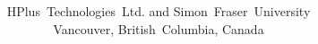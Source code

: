 \documentclass[letterpaper,titlepage,twoside]{report}
\title{\cal\Huge\textitcorr{\MMM}\\
\vspace{1ex}
\objPicture{ChannelManager.eps}}
\author{HPlus~Technologies~Ltd. and Simon~Fraser~University\\
Vancouver, British~Columbia, Canada}
\newcommand{\mymark}{}
\newcommand*{\insertpart}[2]{\clearpage\renewcommand{\mymark}{#1}#2}
\renewcommand{\mymark}{#4}%
\begin{document}

\maketitle

\insertpart{Contents}{\tableofcontents}
\insertpart{List~of~Figures}{\listoffigures}



\clearpage{}













\appendix







\insertpart{Index}{\printindex}
\end{document}
